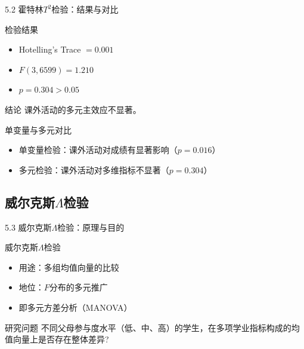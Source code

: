 \documentclass{beamer}
\begin{document}
\begin{frame}{5.2 霍特林\(T^2\)检验：结果与对比}
    \begin{block}{检验结果}
        \begin{itemize}
            \item Hotelling's Trace \(= 0.001\)
            \item \(F(3,6599) = 1.210\)
            \item \(p = 0.304 > 0.05\)
        \end{itemize}
    \end{block}

    \vspace{0.5cm}

    \begin{alertblock}{结论}
        课外活动的多元主效应不显著。
    \end{alertblock}

    \vspace{0.3cm}

    \begin{block}{单变量与多元对比}
        \begin{itemize}
            \item 单变量检验：课外活动对成绩有显著影响（\(p=0.016\)）
            \item 多元检验：课外活动对多维指标不显著（\(p=0.304\)）
        \end{itemize}
    \end{block}
\end{frame}

\subsection{威尔克斯\(\Lambda\)检验}
\begin{frame}{5.3 威尔克斯\(\Lambda\)检验：原理与目的}
    \begin{block}{威尔克斯\(\Lambda\)检验}
        \begin{itemize}
            \item 用途：多组均值向量的比较
            \item 地位：\(F\)分布的多元推广
            \item 即多元方差分析（MANOVA）
        \end{itemize}
    \end{block}

    \vspace{0.5cm}

    \begin{block}{研究问题}
        不同父母参与度水平（低、中、高）的学生，在多项学业指标构成的均值向量上是否存在整体差异?
    \end{block}
\end{frame}
\end{document}
